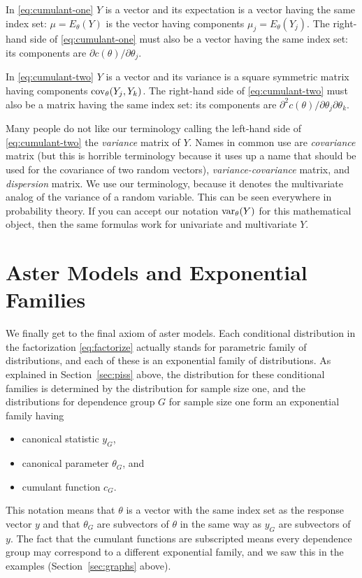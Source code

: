 In \eqref{eq:cumulant-one} $Y$ is a vector and its expectation is a vector
having the same index set: $\mu = E_\theta(Y)$ is the vector having components
$\mu_j = E_\theta(Y_j)$.
The right-hand side of \eqref{eq:cumulant-one} must also be a vector having
the same index set: its components are $\partial c(\theta) / \partial \theta_j$.

In \eqref{eq:cumulant-two} $Y$ is a vector and its variance is a square
symmetric matrix having components $\operatorname{cov}_\theta(Y_j, Y_k)$.
The right-hand side of \eqref{eq:cumulant-two} must also be a matrix having
the same index set: its components are
$\partial^2 c(\theta) / \partial \theta_j \partial \theta_k$.

Many people do not like our terminology calling the left-hand side
of \eqref{eq:cumulant-two} the \emph{variance} matrix of $Y$.
Names in common use are \emph{covariance} matrix (but this is horrible
terminology because it uses up a name that should be used for the covariance
of two random vectors), \emph{variance-covariance} matrix,
and \emph{dispersion} matrix.
We use our terminology, because it denotes the multivariate analog
of the variance of a random variable.
This can be seen everywhere in probability theory.
If you can accept our notation $\operatorname{var}_\theta(Y)$ for this mathematical
object, then the same formulas work for univariate and multivariate $Y$.

\section{Aster Models and Exponential Families}
\label{sec:aster-expfam}

We finally get to the final axiom of aster models.
Each conditional distribution in the factorization \eqref{eq:factorize}
actually stands for parametric family of distributions,
and each of these is an exponential family of distributions.
As explained in Section~\ref{sec:piss} above,
the distribution for these conditional families is determined
by the distribution for sample size one, and the distributions
for dependence group $G$ for sample size one form an exponential family having
\begin{itemize}
\item canonical statistic $y_G$,
\item canonical parameter $\theta_G$, and
\item cumulant function $c_G$.
\end{itemize}
This notation means that $\theta$ is a vector with the same index set as
the response vector $y$ and that $\theta_G$ are subvectors of $\theta$
in the same way as $y_G$ are subvectors of $y$.
The fact that the cumulant functions are subscripted means every
dependence group may correspond to a different exponential family,
and we saw this in the examples (Section~\ref{sec:graphs} above).

